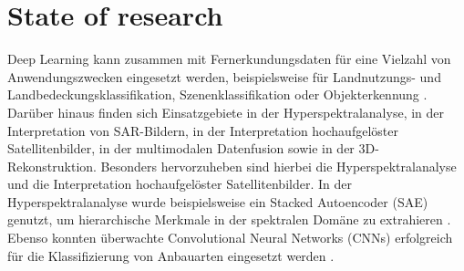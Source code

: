 \chapter{State of research}
\label{ch:state_of_research}












Deep Learning kann zusammen mit Fernerkundungsdaten für eine Vielzahl von Anwendungszwecken eingesetzt werden, beispielsweise für Landnutzungs- und Landbedeckungsklassifikation, Szenenklassifikation oder Objekterkennung \cite{Zhu2017}. Darüber hinaus finden sich Einsatzgebiete in der Hyperspektralanalyse, in der Interpretation von SAR-Bildern, in der Interpretation hochaufgelöster Satellitenbilder, in der multimodalen Datenfusion sowie in der 3D-Rekonstruktion. Besonders hervorzuheben sind hierbei die Hyperspektralanalyse und die Interpretation hochaufgelöster Satellitenbilder. In der Hyperspektralanalyse wurde beispielsweise ein Stacked Autoencoder (SAE) genutzt, um hierarchische Merkmale in der spektralen Domäne zu extrahieren \cite{Chen2014}. Ebenso konnten überwachte Convolutional Neural Networks (CNNs) erfolgreich für die Klassifizierung von Anbauarten eingesetzt werden \cite{Kussul2017}.

